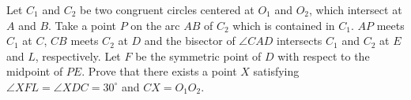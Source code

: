 Let $ C_1$ and $ C_2$ be two congruent circles centered at $ O_1$ and $ O_2$,  which intersect at $ A$ and $ B$. Take a point $ P$ on the arc $ AB$ of $ C_2$ which is contained in $ C_1$. $ AP$ meets $ C_1$ at $ C$,  $ CB$ meets $ C_2$ at $ D$ and the bisector of $ \angle CAD$ intersects $ C_1$ and $ C_2$ at $ E$ and $ L$,  respectively. Let $ F$ be the symmetric point of $ D$ with respect to the midpoint of $ PE$. Prove that there exists a point $ X$ satisfying $ \angle XFL = \angle XDC = 30^\circ$ and $ CX = O_1O_2$.
